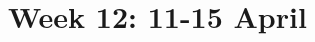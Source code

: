 \documentclass[cal1spr16Lectures.tex]{subfiles}
\begin{document}
\section[Week 12]{Week 12: 11-15 April}




\end{document}
